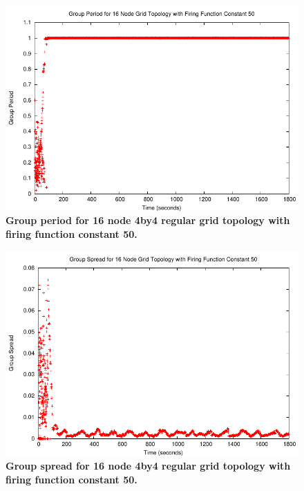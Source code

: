 \begin{figure}[t]
\begin{center}
\includegraphics[width=1.0\hsize]{./figures/5-Jan-2005-1-GRID-NODES-16-50CONSTANT-GROUP-PERIOD.pdf}
\end{center}
\caption{{\small {\bf Group period for 16 node 4by4 regular grid topology with firing function constant 50.} }}
\label{fig:ggp}
\end{figure}


\begin{figure}[t]
\begin{center}
\includegraphics[width=1.0\hsize]{./figures/5-Jan-2005-1-GRID-NODES-16-50CONSTANT-GROUP-SPREAD.pdf}
\end{center}
\caption{{\small {\bf Group spread for 16 node 4by4 regular grid topology with firing function constant 50.} }}
\label{fig:ggs}
\end{figure}


